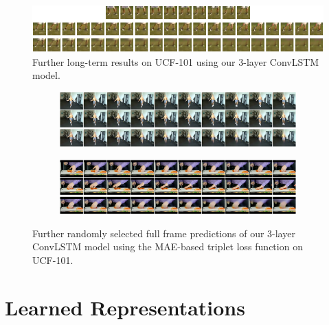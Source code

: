 \vspace{.2cm}
\begin{figure}[htpb]
	\centering
	\includegraphics[width=1.0\linewidth]{figures/pred/ucf/long/pred-00.png} 
	\caption[Random Long-Term Prediction Samples on UCF-101]{Further long-term results on UCF-101 using our 3-layer ConvLSTM model.} \label{fig:ucf-long2}
\end{figure}

\vspace{.2cm}
\begin{figure}[h!tb]
\centering
\begin{subfigure}{1.0\textwidth}
  \centering
  \includegraphics[width=1.0\linewidth]{figures/pred/ucf/full/pred-02.png}
  \caption{}
  \label{fig:ucf-full2a}
  \vspace{.1cm}
\end{subfigure}
\begin{subfigure}{1.0\textwidth}
  \centering
  \includegraphics[width=1.0\linewidth]{figures/pred/ucf/full/pred-03.png}
  \caption{}
  \label{fig:ucf-full2b}
  \vspace{.1cm}
\end{subfigure}
\caption[Random Full Frame Prediction Sample on UCF-101]{Further randomly selected full frame predictions of our 3-layer ConvLSTM model using the MAE-based triplet loss function on UCF-101.}
\label{fig:ucf-full2}
\end{figure}


\clearpage
\section{Learned Representations}

